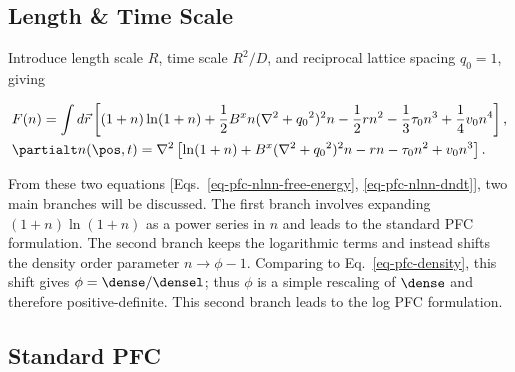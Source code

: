 \subsection{Length \& Time Scale}
Introduce length scale $R$, time scale $R^2/D$, and reciprocal lattice spacing $q_0 = 1$, giving

\begin{subequations}
\begin{align}
&F(n) = \int d\vec{r} \left[ (1+n)\ln(1+n) + \frac{1}{2}B^x n (\nabla^2 + {q_0}^2)^2 n - \frac{1}{2} rn^2 - \frac{1}{3} \tau_0 n^3 + \frac{1}{4}v_0 n^4 \right], \label{eq-pfc-nlnn-free-energy} \\
&\partialt n(\pos, t) = \nabla^2 \left[ \ln(1+n) + B^x (\nabla^2 + {q_0}^2)^2 n - r n - \tau_0 n^2 + v_0 n^3 \right]. \label{eq-pfc-nlnn-dndt}
\end{align}
\end{subequations}

From these two equations [Eqs.~\ref{eq-pfc-nlnn-free-energy}, \ref{eq-pfc-nlnn-dndt}], two main branches will be discussed.  The first branch involves expanding $(1+n)\ln(1+n)$ as a power series in $n$ and leads to the standard PFC formulation.  The second branch keeps the logarithmic terms and instead shifts the density order parameter $n \rightarrow \phi - 1$.  Comparing to Eq.~\ref{eq-pfc-density}, this shift gives $\phi = \dense/\densel$; thus $\phi$ is a simple rescaling of $\dense$ and therefore positive-definite.  This second branch leads to the log PFC formulation.

\subsection{Standard PFC}

